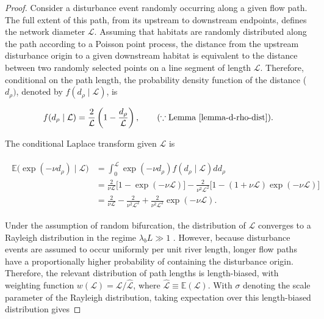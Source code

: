 \documentclass[11pt, class=article, crop=false]{standalone}
\theoremstyle{definition}
\begin{document}
\begin{proof}
    Consider a disturbance event randomly occurring along a given flow path.
    The full extent of this path, from its upstream to downstream endpoints, defines the network diameter $\mathcal{L}$.
    Assuming that habitats are randomly distributed along the path according to a Poisson point process, the distance from the upstream disturbance origin to a given downstream habitat is equivalent to the distance between two randomly selected points on a line segment of length $\mathcal{L}$.
    Therefore, conditional on the path length, the probability density function of the distance ($d_{\rho})$, denoted by $f(d_{\rho} \mid \mathcal{L})$, is

    \begin{equation}
        f(d_{\rho} \mid \mathcal{L}) = \frac{2}{\mathcal{L}}\left(1 - \frac{d_{\rho}}{\mathcal{L}}\right),
        \qquad (\because \text{Lemma \ref{lemma-d-rho-dist}}).
    \end{equation}
    
    The conditional Laplace transform given $\mathcal{L}$ is
    
    \begin{align}
        \begin{split}
            \mathbb{E}\bigl(\exp({-\nu d_{\rho}}) \mid \mathcal{L} \bigr)
            &= 
            \int_0^{\mathcal{L}} \exp({-\nu d_{\rho}}) f(d_{\rho} \mid \mathcal{L}) dd_{\rho}\\
            &= 
            \frac{2}{\nu \mathcal{L}}\bigl[1 - \exp(-\nu \mathcal{L})\bigr] -
            \frac{2}{\nu^2 \mathcal{L}^2}\bigl[1 - (1 + \nu \mathcal{L}) \exp(-\nu \mathcal{L}) \bigr]\\
            &= 
            \frac{2}{\nu \mathcal{L}}
            -
            \frac{2}{\nu^2 \mathcal{L}^2}
            +
            \frac{2}{\nu^2 \mathcal{L}^2} \exp(-\nu \mathcal{L})
            .    
        \end{split}
    \end{align}
    
    Under the assumption of random bifurcation, the distribution of $\mathcal{L}$ converges to a Rayleigh distribution in the regime $\lambda_b L \gg 1$ \citep{ojeda_distance_2022}.
    However, because disturbance events are assumed to occur uniformly per unit river length, longer flow paths have a proportionally higher probability of containing the disturbance origin. Therefore, the relevant distribution of path lengths is length-biased, with weighting function $w(\mathcal{L}) = \mathcal{L}/\hat{\mathcal{L}}$, where $\hat{\mathcal{{L}}} \equiv \mathbb{E}(\mathcal{L})$.
    With $\sigma$ denoting the scale parameter of the Rayleigh distribution, taking expectation over this length-biased distribution gives


\end{proof}
\end{document}
